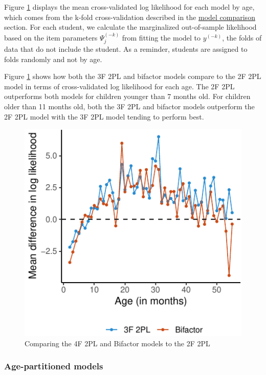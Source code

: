\documentclass[10pt, letterpaper]{article}
\newenvironment{CodeChunk}{}{}
\begin{document}
Figure \ref{fig:byage} displays the mean cross-validated log likelihood
for each model by age, which comes from the k-fold cross-validation
described in the \protect\hyperlink{modelcompare}{model comparison}
section. For each student, we calculate the marginalized out-of-sample
likelihood based on the item parameters \(\Psi_j^{(-k)}\) from fitting
the model to \(y^{(-k)}\), the folds of data that do not include the
student. As a reminder, students are assigned to folds randomly and not
by age.

Figure \ref{fig:byage} shows how both the 3F 2PL and bifactor models
compare to the 2F 2PL model in terms of cross-validated log likelihood
for each age. The 2F 2PL outperforms both models for children younger
than 7 months old. For children older than 11 months old, both the 3F
2PL and bifactor models outperform the 2F 2PL model with the 3F 2PL
model tending to perform best.

\begin{CodeChunk}
\begin{figure}[tb]
\includegraphics{figs/byage-1} \caption[Comparing the 4F 2PL and Bifactor models to the 2F 2PL]{Comparing the 4F 2PL and Bifactor models to the 2F 2PL}\label{fig:byage}
\end{figure}
\end{CodeChunk}

\vskip 0.1in

\hypertarget{age-partitioned-models}{%
\subsubsection{Age-partitioned models}\label{age-partitioned-models}}
\end{document}
